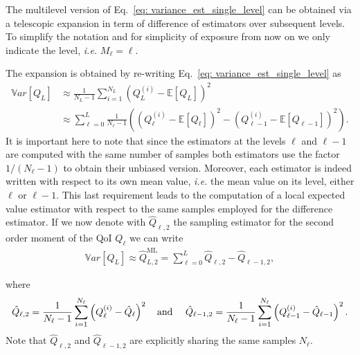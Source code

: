 The multilevel version of Eq.~\eqref{eq: variance_est_single_level} can be obtained via a telescopic expansion in term of difference of estimators over subsequent levels. To simplify the notation and for simplicity of exposure from now on 
we only indicate the level, \textit{i.e.} $M_\ell = \ell$. 

The expansion is obtained by re-writing Eq.~\eqref{eq: variance_est_single_level} as 
\begin{equation}
\begin{split}
\label{eq: variance_est_ML}
 \mathbb{V}ar\left[Q_L\right] &\approx       \frac{1}{N_L - 1} \sum_{i=1}^{N_L} \left( Q_L^{(i)} - \mathbb{E}\left[Q_L\right] \right)^2 \\
                              &\approx \sum_{\ell=0}^L  \frac{1}{N_\ell - 1} \left( \left( Q_{\ell}^{(i)} - \mathbb{E}\left[Q_{\ell}\right] \right)^2 
                                                                                  - \left( Q_{{\ell-1}}^{(i)} - \mathbb{E}\left[Q_{\ell-1}\right] \right)^2 \right).
\end{split}
\end{equation}
It is important here to note that since the estimators at the levels $\ell$ and $\ell-1$ are computed with the same number of samples both estimators use the factor 
$1/(N_\ell-1)$ to obtain their unbiased version. Moreover, each estimator is indeed written with respect to its own mean value, \textit{i.e.} the mean value on its level,
either $\ell$ or $\ell-1$. This last requirement leads to the computation of a local expected value estimator with respect to the same samples employed for the difference estimator. If we now denote with $\hat{Q}_{\ell,2}$ the sampling estimator for the second order moment of the QoI $Q_\ell$ we can write
\begin{equation}
\begin{split}
\label{eq: variance_est_ML_approximation}
 \mathbb{V}ar\left[Q_L\right] \approx \hat{Q}_{L,2}^{\mathrm{ML}} = \sum_{\ell=0}^L \hat{Q}_{\ell,2} - \hat{Q}_{\ell-1,2},
\end{split}
\end{equation}

where 
\begin{equation}
\label{eq: variance_est_ML_level_terms}
 \hat{Q}_{\ell,2} = \frac{1}{N_\ell - 1} \sum_{i=1}^{N_\ell} \left( Q_\ell^{(i)} - \hat{Q}_\ell \right)^2
\text{\quad  and \quad}
 \hat{Q}_{\ell - 1,2} = \frac{1}{N_\ell - 1} \sum_{i=1}^{N_\ell} \left( Q_{\ell - 1}^{(i)} - \hat{Q}_{\ell - 1} \right)^2.
\end{equation}
Note that $\hat{Q}_{\ell,2}$ and $\hat{Q}_{\ell - 1,2}$ are explicitly sharing the same samples $N_\ell$.

